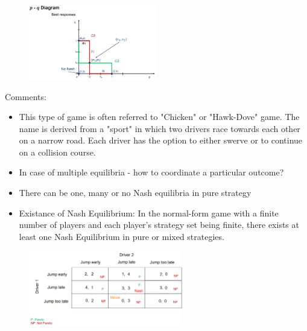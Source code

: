 \begin{figure}[H]
    \centering
    \includegraphics[width=0.5\textwidth]{Pictures/chicken_p_g_diagram.png}
\end{figure}

Comments:
\begin{itemize}
    \item This type of game is often referred to "Chicken" or "Hawk-Dove" game.
        The name is derived from a "sport" in which two drivers race towards each other
        on a narrow road. Each driver has the option to either swerve or to
        continue on a collision course.
    \item In case of multiple equilibria - how to coordinate a particular outcome?
    \item There can be one, many or no Nash equilibria in pure strategy
    \item Existance of Nash Equilibrium: In the normal-form game with a finite
        number of players and each player's strategy set being finite, there
        exists at least one Nash Equilibrium in pure or mixed strategies.
\end{itemize}

\begin{figure}[H]
    \centering
    \includegraphics[width=0.6\textwidth]{Pictures/chicken_driver_solution.png}
\end{figure}

\vspace{1\baselineskip}

